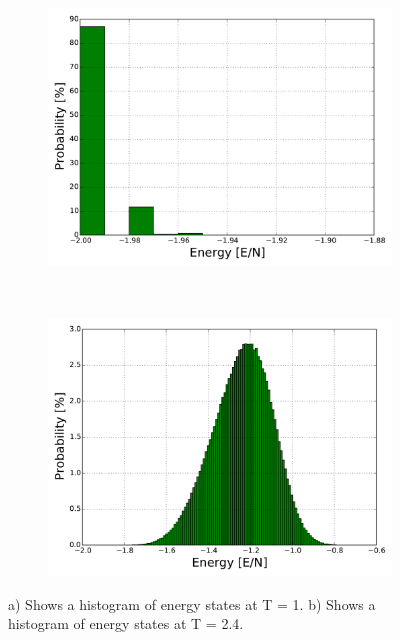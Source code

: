 \begin{figure}[H]
    \centering
    \begin{subfigure}{0.5\textwidth}
        \centering
        \includegraphics[width=\linewidth]{result/bilder/hist/MC1000000T1-distN20-hist}
        \caption{}
    \end{subfigure}%
    ~ 
    \begin{subfigure}{0.5\textwidth}
        \centering
        \includegraphics[width=\linewidth]{result/bilder/hist/MC1000000T24-distN20-hist}
        \caption{}
    \end{subfigure}
    \caption{a) Shows a histogram of energy states at T = 1. b) Shows a histogram of energy states at T = 2.4. }
    \label{fig:hist}
\end{figure}




